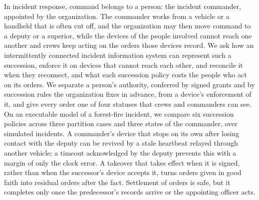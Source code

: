 In incident response, command belongs to a person: the incident commander, appointed by
the organization. The commander works from a vehicle or a handheld that is often cut off,
and the organization may then move command to a deputy or a superior, while the devices of
the people involved cannot reach one another and crews keep acting on the orders those
devices record. We ask how an intermittently connected incident information system can
represent such a succession, enforce it on devices that cannot reach each other, and
reconcile it when they reconnect, and what each succession policy costs the people who act
on its orders. We separate a person's authority, conferred by signed grants and by
succession rules the organization fixes in advance, from a device's enforcement of it, and
give every order one of four statuses that crews and commanders can see. On an executable
model of a forest-fire incident, we compare six succession policies across three partition
cases and three states of the commander, over \tbTotalRuns{} simulated incidents. A
commander's device that stops on its own after losing contact with the deputy can be
revived by a stale heartbeat relayed through another vehicle; a timeout acknowledged by
the deputy prevents this with a margin of only the clock error. A takeover that takes
effect when it is signed, rather than when the successor's device accepts it, turns orders
given in good faith into residual orders after the fact. Settlement of orders is safe, but
it completes only once the predecessor's records arrive or the appointing officer acts.
